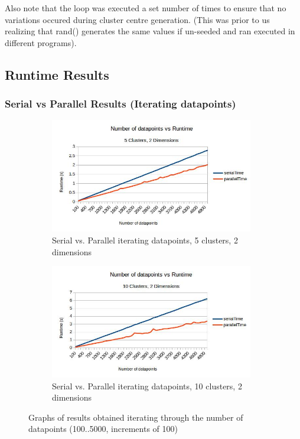 \documentclass{article}
\begin{document}
Also note that the loop was executed a set number of times to ensure that no variations occured during cluster centre generation. (This was prior to us realizing that rand() generates the same values if un-seeded and ran executed in different programs).

\newpage
\subsection{Runtime Results}
\subsubsection{Serial vs Parallel Results (Iterating datapoints)}
\begin{figure}[h!]
    \begin{subfigure}{0.5\textwidth}
        \includegraphics[width=0.9\linewidth, height=5cm]{Pictures/datapoints1.jpg}
        \caption{Serial vs. Parallel iterating datapoints, 5 clusters, 2 dimensions}
    \end{subfigure}
    \begin{subfigure}{0.5\textwidth}
        \includegraphics[width=0.9\linewidth, height=5cm]{Pictures/datapoints2.jpg}
        \caption{Serial vs. Parallel iterating datapoints, 10 clusters, 2 dimensions}
    \end{subfigure}
\caption{Graphs of results obtained iterating through the number of datapoints (100..5000, increments of 100)}
\end{figure}
\end{document}
